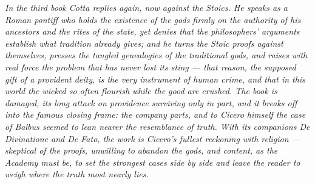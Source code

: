 \textit{In the third book Cotta replies again, now against the Stoics. He
speaks as a Roman pontiff who holds the existence of the gods firmly on the
authority of his ancestors and the rites of the state, yet denies that the
philosophers' arguments establish what tradition already gives; and he
turns the Stoic proofs against themselves, presses the tangled genealogies
of the traditional gods, and raises with real force the problem that has
never lost its sting --- that reason, the supposed gift of a provident
deity, is the very instrument of human crime, and that in this world the
wicked so often flourish while the good are crushed. The book is damaged,
its long attack on providence surviving only in part, and it breaks off
into the famous closing frame: the company parts, and to Cicero himself the
case of Balbus seemed to lean nearer the resemblance of truth. With its
companions \textit{De Divinatione} and \textit{De Fato}, the work is
Cicero's fullest reckoning with religion --- skeptical of the proofs,
unwilling to abandon the gods, and content, as the Academy must be, to set
the strongest cases side by side and leave the reader to weigh where the
truth most nearly lies.}
